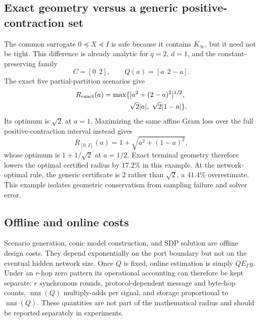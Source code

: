 \documentclass[journal,10pt]{IEEEtran}
\theoremstyle{definition}
\theoremstyle{remark}
\begin{document}
\subsection{Exact geometry versus a generic positive-contraction set}

The common surrogate $0\preceq X\preceq I$ is safe because it contains
$K_\infty$, but it need not be tight.  This difference is already analytic for
$q=2$, $d=1$, and the constant-preserving family
\begin{equation}
 C=[0\ \ 2],\qquad Q(a)=[a\ \ 2-a].
 \label{eq:outer-example-data}
\end{equation}
The exact five partial-partition scenarios give
\begin{equation}
\begin{aligned}
 R_{\rm exact}(a)=\max\{&[a^2+(2-a)^2]^{1/2},\\
                         &\sqrt2|a|,\ \sqrt2|1-a|\}.
\end{aligned}
\label{eq:exact-outer-comparison}
\end{equation}
Its optimum is $\sqrt2$ at $a=1$.  Maximizing the same affine Gram loss over
the full positive-contraction interval instead gives
\begin{equation}
 R_{[0,I]}(a)=1+\sqrt{a^2+(1-a)^2},
 \label{eq:outer-radius}
\end{equation}
whose optimum is $1+1/\sqrt2$ at $a=1/2$.  Exact terminal geometry therefore
lowers the optimal certified radius by $17.2\%$ in this example.  At the
network-optimal rule, the generic certificate is $2$ rather than $\sqrt2$, a
$41.4\%$ overestimate.  This example isolates geometric conservatism from
sampling failure and solver error.

\subsection{Offline and online costs}

Scenario generation, conic model construction, and SDP solution are offline
design costs.  They depend exponentially on the port boundary but not on the
eventual hidden network size.  Once $Q$ is fixed, online estimation is simply
$QE_\Gamma y$.  Under an $r$-hop zero pattern its operational accounting can
therefore be kept separate: $r$ synchronous rounds, protocol-dependent message
and byte-hop counts, $\operatorname{nnz}(Q)$ multiply-adds per signal, and
storage proportional to $\operatorname{nnz}(Q)$.  These quantities are not
part of the mathematical radius and should be reported separately in
experiments.
\end{document}

